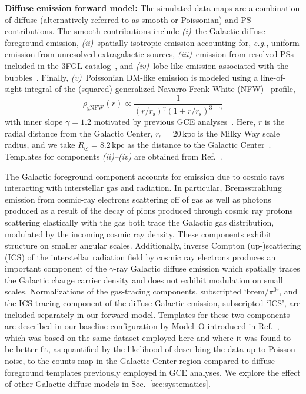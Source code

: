 \documentclass[prd,aps,10pt,nofootinbib,twocolumn,superscriptaddress,preprintnumbers,balancelastpage,longbibliography]{revtex4-1}
\begin{document}
\noindent
\textbf{Diffuse emission forward model:} The simulated data maps are a combination of diffuse (alternatively referred to as smooth or Poissonian) and PS contributions. The smooth contributions include \emph{(i)}~the Galactic diffuse foreground emission, \emph{(ii)}~spatially isotropic emission accounting for, \emph{e.g.}, uniform emission from unresolved extragalactic sources, \emph{(iii)}~emission from resolved PSs included in the \Fermi 3FGL catalog~\cite{Fermi-LAT:2015bhf}, and \emph{(iv)}~lobe-like emission associated with the \Fermi bubbles~\cite{Su:2010qj}. Finally, \emph{(v)}~Poissonian DM-like emission is modeled using a line-of-sight integral of the (squared) generalized Navarro-Frenk-White (NFW)~\cite{Navarro:1995iw,Navarro:1996gj} profile,
\begin{equation}
\label{eq:nfw}
\rho_\mathrm{gNFW}(r) \propto \frac{1}{\left(r / r_{\mathrm s}\right)^{\gamma}\left(1+r / r_{\mathrm s}\right)^{3-\gamma}}
\end{equation}
with inner slope $\gamma=1.2$ motivated by previous GCE analyses~\cite{Gordon:2013vta,Daylan:2014rsa,Zhou:2014lva}. Here, $r$ is the radial distance from the Galactic Center, $r_{\mathrm s}=20\,\mathrm{kpc}$ is the Milky Way scale radius, and we take $R_\odot = 8.2\,\mathrm{kpc}$ as the distance to the Galactic Center~\cite{2020arXiv201202169B,2019A&A...625L..10G}. Templates for components \emph{(ii)--(iv)} are obtained from Ref.~\cite{rodd_nicholas_safdi_siddharth_2016}. 

The Galactic foreground component accounts for emission due to cosmic rays interacting with interstellar gas and radiation. In particular, Bremsstrahlung emission from cosmic-ray electrons scattering off of gas as well as photons produced as a result of the decay of pions produced through cosmic ray protons scattering elastically with the gas both trace the Galactic gas distribution, modulated by the incoming cosmic ray density. These components exhibit structure on smaller angular scales. Additionally, inverse Compton (up-)scattering (ICS) of the interstellar radiation field by cosmic ray electrons produces an important component of the $\gamma$-ray Galactic diffuse emission which spatially traces the Galactic charge carrier density and does not exhibit modulation on small scales. Normalizations of the gas-tracing components, subscripted `brem/$\pi^0$', and the ICS-tracing component of the diffuse Galactic emission, subscripted `ICS', are included separately in our forward model. Templates for these two components are described in our baseline configuration by {Model~O} introduced in Ref.~\cite{Buschmann:2020adf}, which was based on the same \Fermi dataset employed here and where it was found to be better fit, as quantified by the likelihood of describing the data up to Poisson noise, to the counts map in the Galactic Center region compared to diffuse foreground templates previously employed in GCE analyses. We explore the effect of other Galactic diffuse models in Sec.~\ref{sec:systematics}. 
\end{document}
